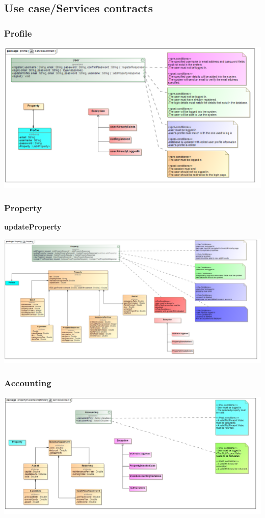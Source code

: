 \documentclass[a4paper,12pt]{article}
\begin{document}
\subsection{Use case/Services contracts}
\subsubsection{Profile}
	\includegraphics[width=1\textwidth]{./Images/newDiagrams/serviceContract/ServiceContract.png}

\subsubsection{Property}
\textbf{\large{updateProperty}} 

\includegraphics[width=1\textwidth]{./Images/newDiagrams/serviceContract/Property.png} 

\subsubsection{Accounting}
\includegraphics[width=1\textwidth]{./Images/newDiagrams/serviceContract/Priscilla/serviceContract.jpg}
\end{document}
